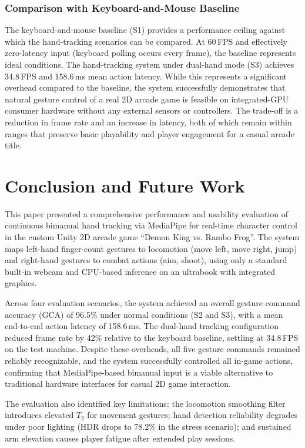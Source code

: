 \documentclass[journal,onecolumn,12pt,draftclsnofoot]{IEEEtran}
\begin{document}
\begin{itemize}
\subsubsection{Comparison with Keyboard-and-Mouse Baseline}
The keyboard-and-mouse baseline (S1) provides a performance ceiling against which the hand-tracking scenarios can be compared. At 60\,FPS and effectively zero-latency input (keyboard polling occurs every frame), the baseline represents ideal conditions. The hand-tracking system under dual-hand mode (S3) achieves 34.8\,FPS and 158.6\,ms mean action latency. While this represents a significant overhead compared to the baseline, the system successfully demonstrates that natural gesture control of a real 2D arcade game is feasible on integrated-GPU consumer hardware without any external sensors or controllers. The trade-off is a reduction in frame rate and an increase in latency, both of which remain within ranges that preserve basic playability and player engagement for a casual arcade title.

\section{Conclusion and Future Work}
This paper presented a comprehensive performance and usability evaluation of continuous bimanual hand tracking via MediaPipe for real-time character control in the custom Unity 2D arcade game ``Demon King vs. Rambo Frog''. The system maps left-hand finger-count gestures to locomotion (move left, move right, jump) and right-hand gestures to combat actions (aim, shoot), using only a standard built-in webcam and CPU-based inference on an ultrabook with integrated graphics.

Across four evaluation scenarios, the system achieved an overall gesture command accuracy (GCA) of 96.5\% under normal conditions (S2 and S3), with a mean end-to-end action latency of 158.6\,ms. The dual-hand tracking configuration reduced frame rate by 42\% relative to the keyboard baseline, settling at 34.8\,FPS on the test machine. Despite these overheads, all five gesture commands remained reliably recognizable, and the system successfully controlled all in-game actions, confirming that MediaPipe-based bimanual input is a viable alternative to traditional hardware interfaces for casual 2D game interaction.

The evaluation also identified key limitations: the locomotion smoothing filter introduces elevated $T_2$ for movement gestures; hand detection reliability degrades under poor lighting (HDR drops to 78.2\% in the stress scenario); and sustained arm elevation causes player fatigue after extended play sessions.


\end{itemize}
\end{document}
